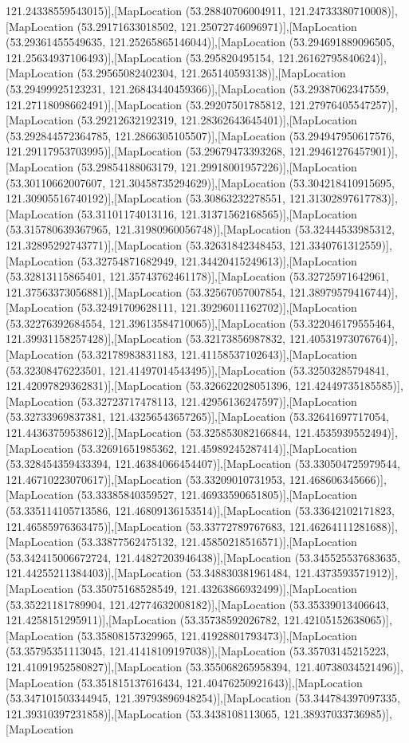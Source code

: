 121.24338559543015)],[MapLocation (53.28840706004911, 121.24733380710008)],[MapLocation (53.29171633018502, 121.25072746096971)],[MapLocation (53.29361455549635, 121.25265865146044)],[MapLocation (53.294691889096505, 121.25634937106493)],[MapLocation (53.295820495154, 121.26162795840624)],[MapLocation (53.29565082402304, 121.265140593138)],[MapLocation (53.29499925123231, 121.26843440459366)],[MapLocation (53.29387062347559, 121.27118098662491)],[MapLocation (53.29207501785812, 121.27976405547257)],[MapLocation (53.29212632192319, 121.28362643645401)],[MapLocation (53.292844572364785, 121.2866305105507)],[MapLocation (53.294947950617576, 121.29117953703995)],[MapLocation (53.29679473393268, 121.29461276457901)],[MapLocation (53.29854188063179, 121.29918001957226)],[MapLocation (53.30110662007607, 121.30458735294629)],[MapLocation (53.304218410915695, 121.30905516740192)],[MapLocation (53.30863232278551, 121.31302897617783)],[MapLocation (53.31101174013116, 121.31371562168565)],[MapLocation (53.315780639367965, 121.31980960056748)],[MapLocation (53.32444533985312, 121.32895292743771)],[MapLocation (53.32631842348453, 121.3340761312559)],[MapLocation (53.32754871682949, 121.34420415249613)],[MapLocation (53.32813115865401, 121.35743762461178)],[MapLocation (53.32725971642961, 121.37563373056881)],[MapLocation (53.32567057007854, 121.38979579416744)],[MapLocation (53.32491709628111, 121.39296011162702)],[MapLocation (53.32276392684554, 121.39613584710065)],[MapLocation (53.322046179555464, 121.39931158257428)],[MapLocation (53.32173856987832, 121.40531973076764)],[MapLocation (53.32178983831183, 121.41158537102643)],[MapLocation (53.32308476223501, 121.41497014543495)],[MapLocation (53.32503285794841, 121.42097829362831)],[MapLocation (53.326622028051396, 121.42449735185585)],[MapLocation (53.32723717478113, 121.42956136247597)],[MapLocation (53.32733969837381, 121.43256543657265)],[MapLocation (53.32641697717054, 121.44363759538612)],[MapLocation (53.325853082166844, 121.4535939552494)],[MapLocation (53.32691651985362, 121.45989245287414)],[MapLocation (53.328454359433394, 121.46384066454407)],[MapLocation (53.330504725979544, 121.46710223070617)],[MapLocation (53.33209010731953, 121.468606345666)],[MapLocation (53.33385840359527, 121.46933590651805)],[MapLocation (53.335114105713586, 121.46809136153514)],[MapLocation (53.33642102171823, 121.46585976363475)],[MapLocation (53.33772789767683, 121.46264111281688)],[MapLocation (53.33877562475132, 121.45850218516571)],[MapLocation (53.342415006672724, 121.44827203946438)],[MapLocation (53.345525537683635, 121.44255211384403)],[MapLocation (53.348830381961484, 121.4373593571912)],[MapLocation (53.35075168528549, 121.43263866932499)],[MapLocation (53.35221181789904, 121.42774632008182)],[MapLocation (53.35339013406643, 121.4258151295911)],[MapLocation (53.35738592026782, 121.42105152638065)],[MapLocation (53.35808157329965, 121.41928801793473)],[MapLocation (53.35795351113045, 121.41418109197038)],[MapLocation (53.35703145215223, 121.41091952580827)],[MapLocation (53.355068265958394, 121.40738034521496)],[MapLocation (53.351815137616434, 121.40476250921643)],[MapLocation (53.347101503344945, 121.39793896948254)],[MapLocation (53.344784397097335, 121.39310397231858)],[MapLocation (53.3438108113065, 121.38937033736985)],[MapLocation 